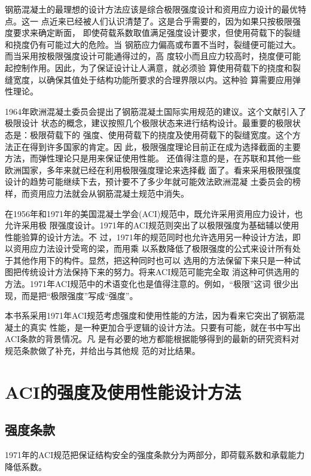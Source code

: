 \documentclass[12pt,a4paper]{book}
\begin{document}
钢筋混凝土的最理想的设计方法应该是综合极限强度设计和资用应力设计的最优特点。这一
点近来已经被人们认识清楚了。这是合乎需要的，因为如果只按极限强度要求来确定断面，
即使荷载系数取值满足强度设计要求，但使用荷载下的裂缝和挠度仍有可能过大的危险。当
钢筋应力偏高或布置不当时，裂缝便可能过大。而当采用按极限强度设计可能通得过的，高
度较小而且应力较高时，挠度便可能起控制作用。因此，为了保证设计让人满意，就必须验
算使用荷载下的挠度和裂缝宽度，以确保其值处于结构功能所要求的合理界限以内。这种验
算需要应用弹性理论。

1964年欧洲混凝土委员会提出了钢筋混凝土国际实用规范的建议。这个文献引入了极限设计
状态的概念，建议按照几个极限状态来进行结构设计。最重要的极限状态是：极限荷载下的
强度、使用荷载下的挠度及使用荷载下的裂缝宽度。这个方法正在得到许多国家的肯定。因
此，极限强度理论目前正在成为选择截面的主要方法，而弹性理论只是用来保证使用性能。
还值得注意的是，在苏联和其他一些欧洲国家，多年来就已经在利用极限强度理论来选择截
面了。看来采用极限强度设计的趋势可能继续下去，预计要不了多少年就可能效法欧洲混凝
土委员会的榜样，而资用应力法就会从钢筋混凝土规范中消失。

在1956年和1971年的美国混凝土学会(ACI)规范中，既允许采用资用应力设计，也允许采用极
限强度设计。1971年的ACI规范则突出了以极限强度为基础辅以使用性能验算的设计方法。不
过，1971年的规范同时也允许选用另一种设计方法，即以资用应力法设计受弯的梁，而用乘
以系数降低了极限强度的公式来设计所有处于其他作用下的构件。显然，把这种同时也可以
选用的方法保留下来只是一种试图把传统设计方法保持下来的努力。将来ACI规范可能完全取
消这种可供选用的方法。1971年ACI规范中的术语变化也是值得注意的。例如，“极限”这词
很少出现，而是把“极限强度”写成“强度”。

本书系采用1971年ACI规范考虑强度和使用性能的方法，因为看来它突出了钢筋混凝土的真实
性能，是一种更加合乎逻辑的设计方法。只要有可能，就在书中写出ACI条款的背景情况。凡
是有必要的地方都能根据能够得到的最新的研究资料对规范条款做了补充，并给出与其他规
范的对比结果。

\section{ACI的强度及使用性能设计方法}

\subsection{强度条款}
\label{sec:aci}

1971年的ACI规范把保证结构安全的强度条款分为两部分，即荷载系数和承载能力降低系数。
\end{document}
